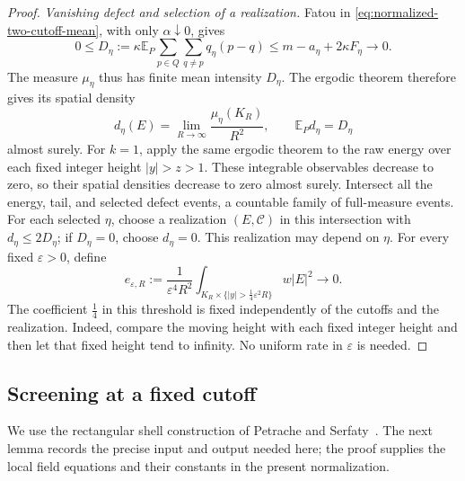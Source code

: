 \begin{proof}
\emph{Vanishing defect and selection of a realization.}
Fatou in \eqref{eq:normalized-two-cutoff-mean}, with only
$\alpha\downarrow0$, gives
\begin{equation}
 0\le D_\eta:=\kappa\mathbb E_P
           \sum_{p\in Q}\sum_{q\ne p}q_\eta(p-q)
       \le m-a_\eta+2\kappa F_\eta\longrightarrow0.
 \label{eq:normalized-defect-small}
\end{equation}
The measure $\mu_\eta$ thus has finite mean intensity $D_\eta$.
The ergodic theorem therefore gives its spatial density
\[
 d_\eta(E)=\lim_{R\to\infty}\frac{\mu_\eta(K_R)}{R^2},
 \qquad \mathbb E_Pd_\eta=D_\eta
\]
almost surely.  For $k=1$, apply the same ergodic theorem
to the raw energy over each fixed integer height $|y|>z>1$.
These integrable observables decrease to zero, so their spatial
densities decrease to zero almost surely.  Intersect all the energy,
tail, and selected defect events, a countable family of full-measure
events. For each selected $\eta$, choose a realization $(E,\mathcal C)$
in this intersection with $d_\eta\le2D_\eta$; if $D_\eta=0$, choose
$d_\eta=0$.  This realization may depend on $\eta$.
For every fixed $\varepsilon>0$, define
\begin{equation}
 e_{\varepsilon,R}:=\frac1{\varepsilon^4R^2}
 \int_{K_R\times\{|y|>\frac14\varepsilon^2R\}}w|E|^2
                         \longrightarrow0.
 \label{eq:normalized-moving-tail}
\end{equation}
The coefficient $\frac14$ in this threshold is fixed independently of
the cutoffs and the realization.
Indeed, compare the moving height with each fixed integer height and
then let that fixed height tend to infinity.  No uniform rate in
$\varepsilon$ is needed.

\end{proof}

\subsection{Screening at a fixed cutoff}

We use the rectangular shell construction of
Petrache and Serfaty~\citep[Section~6.2]{PetracheSerfaty2017}. The next lemma records the
precise input and output needed here; the proof supplies the local field
equations and their constants in the present normalization.

